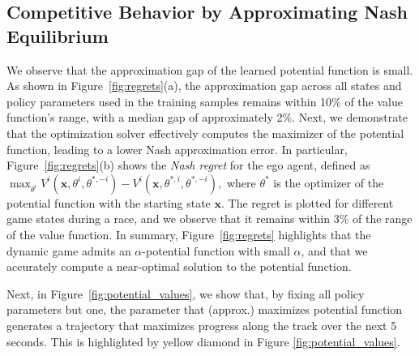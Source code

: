 \subsection{Competitive Behavior by Approximating Nash Equilibrium}
\vspace{-2mm}
We observe that the approximation gap of the learned potential function is small. As shown in Figure~\ref{fig:regrets}(a), the approximation gap across all states and policy parameters used in the training samples remains within 10\% of the value function's range, with a median gap of approximately 2\%.  
Next, we demonstrate that the optimization solver effectively computes the maximizer of the potential function, leading to a lower Nash approximation error. In particular, Figure~\ref{fig:regrets}(b) shows the \textit{Nash regret} for the ego agent, defined as  
\(
\max_{\theta^i} V^i(\mathbf{x}, \theta^i, \theta^{\ast,-i}) - V^i(\mathbf{x}, \theta^{\ast,i}, \theta^{\ast,-i}),
\)  
where \(\theta^\ast\) is the optimizer of the potential function with the starting state \(\mathbf{x}\). The regret is plotted for different game states during a race, and we observe that it remains within 3\% of the range of the value function.  
In summary, Figure~\ref{fig:regrets} highlights that the dynamic game admits an \(\alpha\)-potential function with small \(\alpha\), and that we accurately compute a near-optimal solution to the potential function.



Next, in Figure~\ref{fig:potential_values}, we show that, by fixing all policy parameters but one, the parameter that (approx.) maximizes potential function  
generates a trajectory that maximizes progress along the track over the next 5 seconds. This is highlighted by yellow diamond in Figure \ref{fig:potential_values}.


